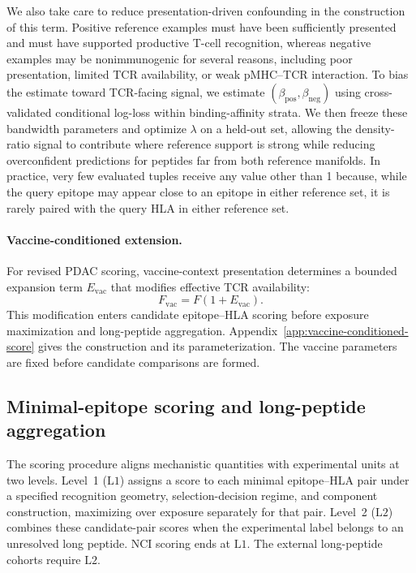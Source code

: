 \documentclass[11pt]{article}
\begin{document}
We also take care to reduce presentation-driven confounding in the construction of this term. Positive reference examples must have been sufficiently presented and must have supported productive T-cell recognition, whereas negative examples may be nonimmunogenic for several reasons, including poor presentation, limited TCR availability, or weak pMHC--TCR interaction. To bias the estimate toward TCR-facing signal, we estimate \((\beta_{\mathrm{pos}},\beta_{\mathrm{neg}})\) using cross-validated conditional log-loss within binding-affinity strata. We then freeze these bandwidth parameters and optimize \(\lambda\) on a held-out set, allowing the density-ratio signal to contribute where reference support is strong while reducing overconfident predictions for peptides far from both reference manifolds. In practice, very few evaluated tuples receive any value other than 1 because, while the query epitope may appear close to an epitope in either reference set, it is rarely paired with the query HLA in either reference set.


\paragraph{Vaccine-conditioned extension.}

For revised PDAC scoring, vaccine-context presentation determines a bounded
expansion term \(E_{\mathrm{vac}}\) that modifies effective TCR availability:
\[
F_{\mathrm{vac}}=F\left(1+E_{\mathrm{vac}}\right).
\]
This modification enters candidate epitope--HLA scoring before exposure
maximization and long-peptide aggregation. Appendix~\ref{app:vaccine-conditioned-score}
gives the construction and its parameterization. The vaccine parameters are
fixed before candidate comparisons are formed.

\subsection*{Minimal-epitope scoring and long-peptide aggregation}

The scoring procedure aligns mechanistic quantities with experimental units at
two levels. Level~1 (\(\mathrm{L1}\)) assigns a score to each minimal
epitope--HLA pair under a specified recognition geometry, selection-decision
regime, and component construction, maximizing over exposure separately for
that pair. Level~2 (\(\mathrm{L2}\)) combines these candidate-pair scores
when the experimental label belongs to an unresolved long peptide. NCI scoring
ends at \(\mathrm{L1}\). The external long-peptide cohorts require
\(\mathrm{L2}\).
\end{document}
